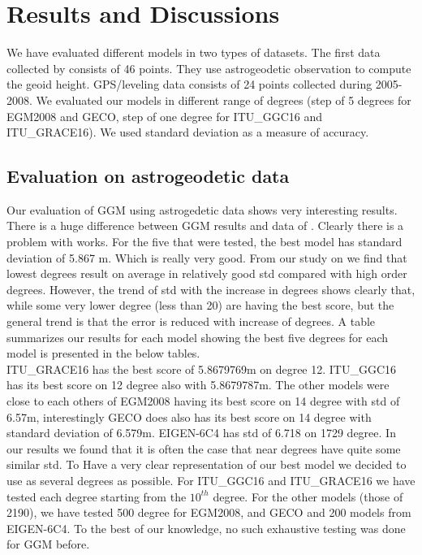 \chapter{Results and Discussions}
We have evaluated different models in two types of datasets. The first data collected by \citep{adam} consists of 46 points. They use astrogeodetic observation to compute the geoid height. GPS/leveling data consists of 24 points collected during 2005-2008. We evaluated our models in different range of degrees (step of 5 degrees for EGM2008 and GECO, step of one degree for ITU\_GGC16 and ITU\_GRACE16). We used standard deviation as a measure of accuracy.

\section{Evaluation on astrogeodetic data}

Our evaluation of GGM using astrogedetic data shows very interesting results. There is a huge difference between GGM results and data of \citep{adam}. Clearly there is a problem with \citep{adam} works. For the five that were tested, the best model has standard deviation of 5.867 m. Which is really very good. From our study on \cite{adam} we find that lowest degrees result on average in relatively good std compared with high order degrees. However, the trend of std with the increase in degrees shows clearly that, while some very lower degree (less than 20) are having the best score, but the general trend is that the error is reduced with increase of degrees. A table summarizes our results for each model showing the best five degrees for each model is presented in the below tables. 
\\
ITU\_GRACE16 has the best score of 5.8679769m on degree 12. ITU\_GGC16 has its best score on 12 degree also with 5.8679787m. The other models were close to each others of EGM2008 having its best score on 14 degree with std of 6.57m, interestingly GECO does also has its best score on 14 degree with standard deviation of 6.579m. EIGEN-6C4 has std of 6.718 on 1729 degree. In our results we found that it is often the case that near degrees have quite some similar std. To Have a very clear representation of our best model we decided to use as several degrees as possible. For ITU\_GGC16 and ITU\_GRACE16 we have tested each degree starting from the $10^{th}$ degree. For the other models (those of 2190), we have tested 500 degree for EGM2008, and GECO and 200 models from EIGEN-6C4. To the best of our knowledge, no such exhaustive testing was done for GGM before.

